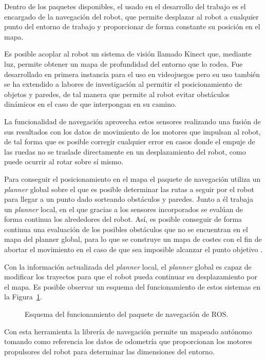 Dentro de los paquetes disponibles, el usado en el desarrollo del trabajo es el encargado de la navegación del robot, que permite desplazar al robot a cualquier punto del entorno de trabajo y proporcionar de forma constante su posición en el mapa.

Es posible acoplar al robot un sistema de visión llamado Kinect que, mediante luz, permite obtener un mapa de profundidad del entorno que lo rodea.
Fue desarrollado en primera instancia para el uso en videojuegos pero su uso también se ha extendido a labores de investigación al permitir el posicionamiento de objetos y paredes, de tal manera que permite al robot evitar obstáculos dinámicos en el caso de que interpongan en su camino.

La funcionalidad de navegación aprovecha estos sensores realizando una fusión de sus resultados con los datos de movimiento de los motores que impulsan al robot, de tal forma que es posible corregir cualquier error en casos donde el empuje de las ruedas no se traslade directamente en un desplazamiento del robot, como puede ocurrir al rotar sobre sí mismo.

Para conseguir el posicionamiento en el mapa el paquete de navegación utiliza un \textit{planner} global sobre el que es posible determinar las rutas a seguir por el robot para llegar a un punto dado sorteando obstáculos y paredes.
Junto a él trabaja un \textit{planner} local, en el que gracias a los sensores incorporados se evalúan de forma continua los alrededores del robot.
Así, es posible conseguir de forma continua una evaluación de los posibles obstáculos que no se encuentran en el mapa del planner global, para lo que se construye un mapa de costes con el fin de abortar el movimiento en el caso de que sea imposible alcanzar el punto objetivo \cite{ROSDoc}.

Con la información actualizada del \textit{planner} local, el \textit{planner} global es capaz de modificar los trayectos para que el robot pueda continuar su desplazamiento por el mapa.
Es posible observar un esquema del funcionamiento de estos sistemas en la Figura~\ref{fig:move_base}.

\begin{figure}[H]
    \centering
    \def\svgwidth{0.8\linewidth}
    
	\caption{Esquema del funcionamiento del paquete de navegación de ROS.}
    \label{fig:move_base}
\end{figure}

Con esta herramienta la librería de navegación permite un mapeado autónomo tomando como referencia los datos de odometría que proporcionan los motores propulsores del robot para determinar las dimensiones del entorno.

